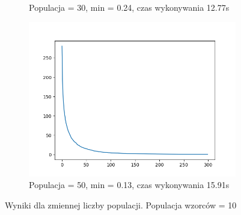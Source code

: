 \documentclass[12pt]{article}
\begin{document}
\begin{figure}[H]
\begin{subfigure}{0.32\textwidth}
        \caption{Populacja = 30, min = 0.24, czas wykonywania 12.77s}
    \end{subfigure}
    \begin{subfigure}{0.32\textwidth}
        \centering
        \includegraphics[width=\linewidth]{plots/s3.png}
        \caption{Populacja = 50, min = 0.13, czas wykonywania 15.91s}
    \end{subfigure}
    \caption{Wyniki dla zmiennej liczby populacji. Populacja wzorców = 10}
\end{figure}
\end{document}
